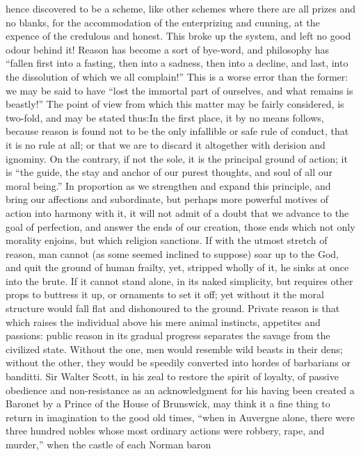 hence discovered to be a scheme, like other schemes where there
are all prizes and no blanks, for the accommodation of the
enterprizing and cunning, at the expence of the credulous and
honest. This broke up the system, and left no good odour behind
it! Reason has become a sort of bye-word, and philosophy has
``fallen first into a fasting, then into a sadness, then into a
decline, and last, into the dissolution of which we all
complain!'' This is a worse error than the former: we may be said
to have ``lost the immortal part of ourselves, and what remains is
beastly!''  The point of view from which this matter may be fairly
considered, is two-fold, and may be stated thus:\textemdash In the
first place, it by no means follows, because reason is found not
to be the only infallible or safe rule of conduct, that it is no
rule at all; or that we are to discard it altogether with derision
and ignominy. On the contrary, if not the sole, it is the
principal ground of action; it is ``the guide, the stay and anchor
of our purest thoughts, and soul of all our moral being.'' In
proportion as we strengthen and expand this principle, and bring
our affections and subordinate, but perhaps more powerful motives
of action into harmony with it, it will not admit of a doubt that
we advance to the goal of perfection, and answer the ends of our
creation, those ends which not only morality enjoins, but which
religion sanctions. If with the utmost stretch of reason, man
cannot (as some seemed inclined to suppose) soar up to the God,
and quit the ground of human frailty, yet, stripped wholly of it,
he sinks at once into the brute. If it cannot stand alone, in its
naked simplicity, but requires other props to buttress it up, or
ornaments to set it off; yet without it the moral structure would
fall flat and dishonoured to the ground. Private reason is that
which raises the individual above his mere animal instincts,
appetites and passions: public reason in its gradual progress
separates the savage from the civilized state. Without the one,
men would resemble wild beasts in their dens; without the other,
they would be speedily converted into hordes of barbarians or
banditti. Sir Walter Scott, in his zeal to restore the spirit of
loyalty, of passive obedience and non-resistance as an
acknowledgment for his having been created a Baronet by a Prince
of the House of Brunswick, may think it a fine thing to return in
imagination to the good old times, ``when in Auvergne alone, there
were three hundred nobles whose most ordinary actions were
robbery, rape, and murder,'' when the castle of each Norman baron
